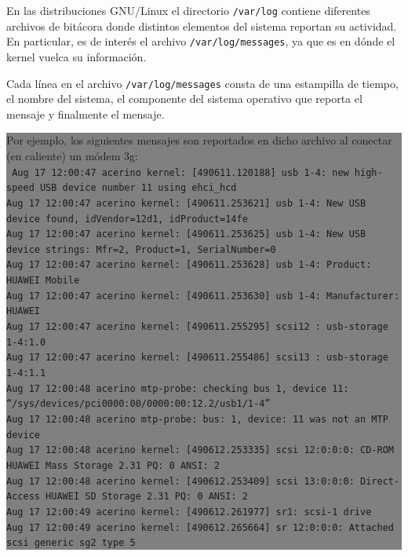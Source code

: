\documentclass[12pt]{article}
\begin{document}
En las distribuciones GNU/Linux el directorio \texttt{/var/log} contiene diferentes 
archivos de bitácora donde distintos elementos del sistema reportan su actividad. En 
particular, es de interés el archivo \texttt{/var/log/messages}, ya que es en dónde 
el kernel vuelca su información. 

Cada línea en el archivo \texttt{/var/log/messages} consta de una estampilla de tiempo, 
el nombre del sistema, el componente del sistema operativo que reporta el mensaje y 
finalmente el mensaje. 

\colorbox{grey}{\parbox[t]{0.95\linewidth}{ \vspace*{0.5cm} { 
Por ejemplo, los siguientes mensajes son reportados en dicho archivo al conectar (en caliente) un módem 3g:\\
{\tt
Aug 17 12:00:47 acerino kernel: [490611.120188] usb 1-4: new high-speed USB device number 11 using ehci\_hcd\\
Aug 17 12:00:47 acerino kernel: [490611.253621] usb 1-4: New USB device found, idVendor=12d1, idProduct=14fe\\
Aug 17 12:00:47 acerino kernel: [490611.253625] usb 1-4: New USB device strings: Mfr=2, Product=1, SerialNumber=0\\
Aug 17 12:00:47 acerino kernel: [490611.253628] usb 1-4: Product: HUAWEI Mobile\\
Aug 17 12:00:47 acerino kernel: [490611.253630] usb 1-4: Manufacturer: HUAWEI\\
Aug 17 12:00:47 acerino kernel: [490611.255295] scsi12 : usb-storage 1-4:1.0\\
Aug 17 12:00:47 acerino kernel: [490611.255486] scsi13 : usb-storage 1-4:1.1\\
Aug 17 12:00:48 acerino mtp-probe: checking bus 1, device 11: ``/sys/devices/pci0000:00/0000:00:12.2/usb1/1-4''\\
Aug 17 12:00:48 acerino mtp-probe: bus: 1, device: 11 was not an MTP device\\
Aug 17 12:00:48 acerino kernel: [490612.253335] scsi 12:0:0:0: CD-ROM            HUAWEI   Mass Storage     2.31 PQ: 0 ANSI: 2\\
Aug 17 12:00:48 acerino kernel: [490612.253409] scsi 13:0:0:0: Direct-Access     HUAWEI   SD Storage       2.31 PQ: 0 ANSI: 2\\
Aug 17 12:00:49 acerino kernel: [490612.261977] sr1: scsi-1 drive\\
Aug 17 12:00:49 acerino kernel: [490612.265664] sr 12:0:0:0: Attached scsi generic sg2 type 5\\
}}}}
\end{document}
